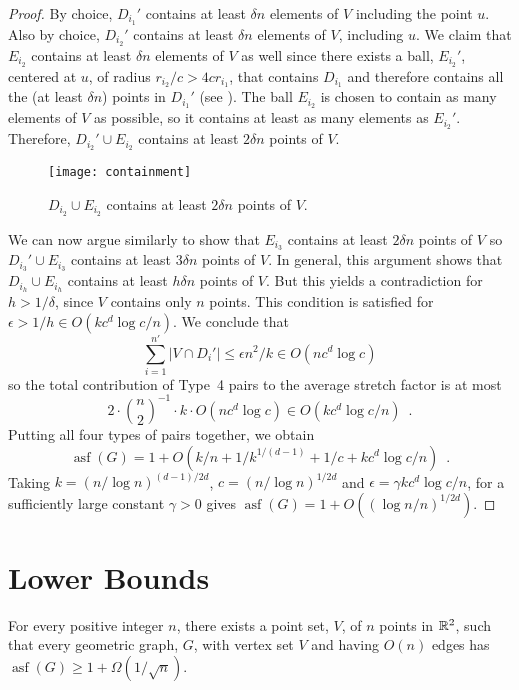 \documentclass{patmorin}
\DeclareMathOperator{\asf}{asf}
\begin{document}
\begin{proof}
  By choice, $D_{i_1}'$ contains at least $\delta n$ elements of $V$
  including the point $u$.  Also by choice, $D_{i_2}'$ contains at least
  $\delta n$ elements of $V$, including $u$.  We claim that $E_{i_2}$
  contains at least $\delta n$ elements of $V$ as well since there
  exists a ball, $E_{i_2}'$, centered at $u$, of radius $r_{i_2}/c >
  4cr_{i_1}$, that contains $D_{i_1}$ and therefore contains all the
  (at least $\delta n$) points in $D_{i_1}'$ (see ).
  The ball $E_{i_2}$ is chosen to contain as many elements of $V$ as
  possible, so it contains at least as many elements as $E_{i_2}'$.
  Therefore, $D_{i_2}'\cup E_{i_2}$ contains at least $2\delta n$
  points of $V$.

  \begin{figure}
     \begin{center}
       \texttt{[image: containment]}
     \end{center}
     \caption{$D_{i_2}\cup E_{i_2}$ contains at least $2\delta n$ 
              points of $V$.}
   \end{figure}

  We can now argue similarly to show that $E_{i_3}$ contains at least
  $2\delta n$ points of $V$ so $D_{i_3}'\cup E_{i_3}$ contains at least
  $3\delta n$ points of $V$.  In general, this argument shows that
  $D_{i_h}\cup E_{i_h}$ contains at least $h\delta n$ points of $V$.
  But this yields a contradiction for $h> 1/\delta$, since $V$ contains
  only $n$ points.  This condition is satisfied for $\epsilon > 1/h \in
  O(kc^d\log c/n)$. We conclude that
  \[
    \sum_{i=1}^{n'}|V\cap D_i'| 
       \le \epsilon n^2/k  \in O(nc^d\log c)
  \]
  so the total contribution of Type~4 pairs to the average stretch factor
  is at most
  \[
    2\cdot\binom{n}{2}^{-1}\cdot k\cdot O(nc^d\log c) \in O(kc^d\log c/n) \enspace .
  \]
  Putting all four types of pairs together, we obtain
  \[
     \asf(G) = 1 + O(k/n + 1/k^{1/(d-1)} + 1/c + kc^d\log c/n) \enspace .
  \]
  Taking $k=(n/\log n)^{(d-1)/2d}$, $c=(n/\log n)^{1/2d}$ and $\epsilon
  = \gamma kc^d\log c/n$, for a sufficiently large constant $\gamma >0$
  gives $\asf(G)=1+O((\log n/n)^{1/2d})$.
\end{proof}



\section{Lower Bounds}

\begin{thm}
  For every positive integer $n$, there exists a point set, $V$, of $n$
  points in $\mathbb{R}^2$, such that every geometric graph, $G$, with vertex
  set $V$ and having $O(n)$ edges has $\asf(G)\ge 1 + \Omega(1/\sqrt{n})$.
\end{thm}
\end{document}
